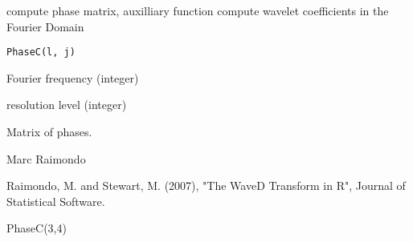 \documentclass{article}
\begin{document}
\begin{Description}\relax
compute phase matrix, auxilliary function compute wavelet coefficients
in the Fourier Domain
\end{Description}
\begin{Usage}
\begin{verbatim}
PhaseC(l, j)
\end{verbatim}
\end{Usage}
\begin{Arguments}
\begin{ldescription}
\item[\code{l}] Fourier frequency (integer) 
\item[\code{j}] resolution level (integer) 
\end{ldescription}
\end{Arguments}
\begin{Value}
Matrix of phases.
\end{Value}
\begin{Author}\relax
Marc Raimondo
\end{Author}
\begin{References}\relax
Raimondo, M. and Stewart, M. (2007),
"The WaveD Transform in R", Journal of Statistical Software.
\end{References}
\begin{SeeAlso}\relax
{}
\end{SeeAlso}
\begin{Examples}
\begin{ExampleCode}
PhaseC(3,4)
\end{ExampleCode}
\end{Examples}
\end{document}
